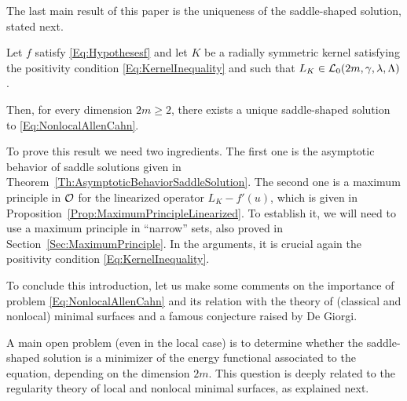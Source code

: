 The last main result of this paper is the uniqueness of the saddle-shaped solution, stated next.

\begin{theorem}
	\label{Th:Uniqueness}
	Let $f$ satisfy \eqref{Eq:Hypothesesf} and let $K$ be a radially symmetric kernel satisfying the positivity condition \eqref{Eq:KernelInequality} and such that $L_K\in \mathcal{L}_0(2m, \gamma, \lambda, \Lambda)$. 
	
	Then, for every dimension $2m \geq 2$, there exists a unique saddle-shaped solution to \eqref{Eq:NonlocalAllenCahn}.
\end{theorem}

To prove this result we need two ingredients. The first one is the asymptotic behavior of saddle solutions given in Theorem~\ref{Th:AsymptoticBehaviorSaddleSolution}. The second one is a maximum principle in $\mathcal{O}$ for the linearized operator $L_K - f'(u)$, which is given in Proposition~\ref{Prop:MaximumPrincipleLinearized}. To establish it, we will need to use a maximum principle in ``narrow'' sets, also proved in Section~\ref{Sec:MaximumPrinciple}. In the arguments, it is crucial again the positivity condition \eqref{Eq:KernelInequality}.

To conclude this introduction, let us make some comments on the importance of problem \eqref{Eq:NonlocalAllenCahn} and its relation with the theory of (classical and nonlocal) minimal surfaces and  a famous conjecture raised by De Giorgi.

A main open problem (even in the local case) is to determine whether the saddle-shaped solution is a minimizer of the energy functional associated to the equation, depending on the dimension $2m$. This question is deeply related to the regularity theory of local and nonlocal minimal surfaces, as explained next.

